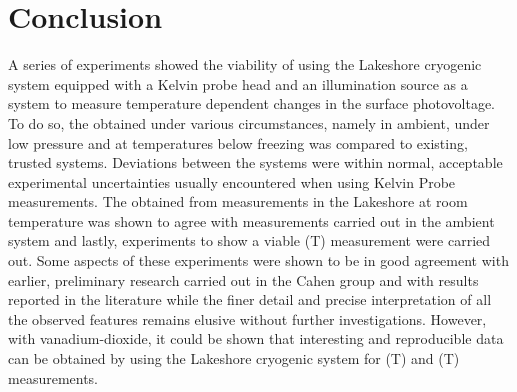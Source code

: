 \section{Conclusion}
A series of experiments showed the viability of using the Lakeshore cryogenic system equipped with a \McA{} Kelvin probe head and an \led{} illumination source as a system to measure temperature dependent changes in the surface photovoltage. To do so, the \cpd{} obtained under various circumstances, namely in ambient, under low pressure and at temperatures below freezing was compared to existing, trusted systems. Deviations between the systems were within normal, acceptable experimental uncertainties usually encountered when using Kelvin Probe measurements. The \spv{} obtained from measurements in the Lakeshore at room temperature was shown to agree with \spv{} measurements carried out in the ambient system and lastly, experiments to show a viable \spv{}(T) measurement were carried out. Some aspects of these experiments were shown to be in good agreement with earlier, preliminary research carried out in the Cahen group and with results reported in the literature while the finer detail and precise interpretation of all the observed features remains elusive without further investigations. However, with vanadium-dioxide, it could be shown that interesting and reproducible data can be obtained by using the Lakeshore cryogenic system for \cpd{}(T) and \spv{}(T) measurements.



